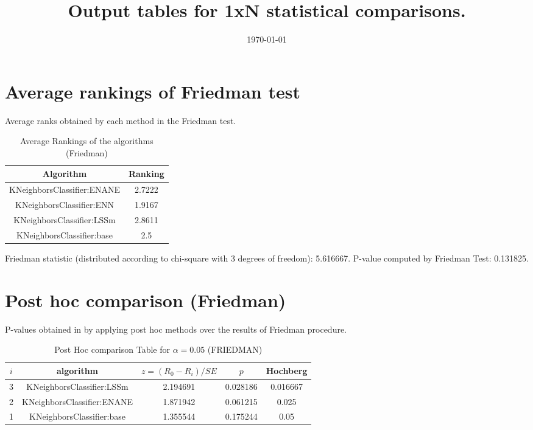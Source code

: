\documentclass[a4paper,10pt]{article}
\title{Output tables for 1xN statistical comparisons.}
\author{}
\date{\today}
\begin{document}
\begin{landscape}
\pagestyle{empty}
\maketitle
\thispagestyle{empty}

\section{Average rankings of Friedman test}


Average ranks obtained by each method in the Friedman test.

\begin{table}[!htp]
\centering
\begin{tabular}{|c|c|}\hline
Algorithm&Ranking\\\hline
KNeighborsClassifier:ENANE&2.7222\\KNeighborsClassifier:ENN&1.9167\\KNeighborsClassifier:LSSm&2.8611\\KNeighborsClassifier:base&2.5\\\hline\end{tabular}
\caption{Average Rankings of the algorithms (Friedman)}
\end{table}

Friedman statistic (distributed according to chi-square with 3 degrees of freedom): 5.616667. \newline P-value computed by Friedman Test: 0.131825.\newline


\newpage

\section{Post hoc comparison (Friedman)}


P-values obtained in by applying post hoc methods over the results of Friedman procedure.

\begin{table}[!htp]
\centering\footnotesize
\begin{tabular}{ccccc}
$i$&algorithm&$z=(R_0 - R_i)/SE$&$p$&Hochberg \\
\hline3&KNeighborsClassifier:LSSm&2.194691&0.028186&0.016667\\2&KNeighborsClassifier:ENANE&1.871942&0.061215&0.025\\1&KNeighborsClassifier:base&1.355544&0.175244&0.05\\\hline
\end{tabular}
\caption{Post Hoc comparison Table for $\alpha=0.05$ (FRIEDMAN)}
\end{table}
\newpage


\end{landscape}
\end{document}
